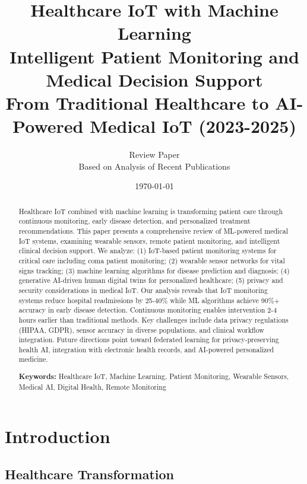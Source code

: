 \documentclass[12pt,a4paper]{article}
\title{
\vspace{-1cm}
{\Huge\bfseries Healthcare IoT with Machine Learning}\\[0.5cm]
{\Large Intelligent Patient Monitoring and Medical Decision Support}\\[0.3cm]
{\large From Traditional Healthcare to AI-Powered Medical IoT (2023-2025)}
}
\author{
\large Review Paper\\[0.2cm]
\normalsize Based on Analysis of Recent Publications
}
\date{\today}
\begin{document}
\maketitle
\thispagestyle{empty}

\begin{abstract}
\noindent
Healthcare IoT combined with machine learning is transforming patient care through continuous monitoring, early disease detection, and personalized treatment recommendations. This paper presents a comprehensive review of ML-powered medical IoT systems, examining wearable sensors, remote patient monitoring, and intelligent clinical decision support. We analyze: (1) IoT-based patient monitoring systems for critical care including coma patient monitoring; (2) wearable sensor networks for vital signs tracking; (3) machine learning algorithms for disease prediction and diagnosis; (4) generative AI-driven human digital twins for personalized healthcare; (5) privacy and security considerations in medical IoT. Our analysis reveals that IoT monitoring systems reduce hospital readmissions by 25-40\% while ML algorithms achieve 90\%+ accuracy in early disease detection. Continuous monitoring enables intervention 2-4 hours earlier than traditional methods. Key challenges include data privacy regulations (HIPAA, GDPR), sensor accuracy in diverse populations, and clinical workflow integration. Future directions point toward federated learning for privacy-preserving health AI, integration with electronic health records, and AI-powered personalized medicine.

\vspace{0.3cm}
\noindent\textbf{Keywords:} Healthcare IoT, Machine Learning, Patient Monitoring, Wearable Sensors, Medical AI, Digital Health, Remote Monitoring
\end{abstract}

\newpage
\tableofcontents
\newpage

\section{Introduction}

\subsection{Healthcare Transformation}
\end{document}
